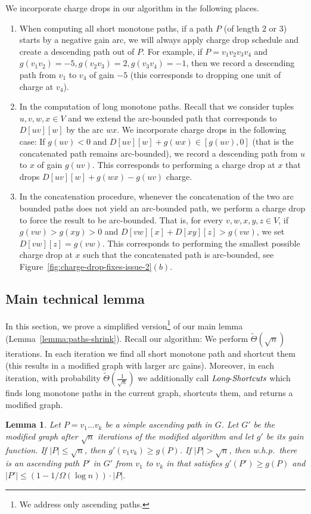 \documentclass[11pt]{article}
\newtheorem{lemma}[theorem]{Lemma}
\newcommand{\LS}{\mbox{{\it Long}-{\it Shortcuts}}}
\begin{document}
We incorporate charge drops in our algorithm in the following places.

\begin{enumerate}
    \item When computing all short monotone paths, if a path $P$ (of length $2$ or $3$) starts by a negative gain arc, we will always apply charge drop schedule and create a descending path out of $P$. For example, if $P = v_1 v_2 v_3 v_4$ and $g(v_1 v_2) = -5, g(v_2 v_3) = 2, g(v_3 v_4) = -1$, then we record a descending path from $v_1$ to $v_4$ of gain $-5$ (this corresponds to dropping one unit of charge at $v_4$).
    \item In the computation of long monotone paths. Recall that we consider tuples $u,v,w,x\in V$ and we extend the arc-bounded path that corresponds to $D[uv][w]$ by the arc $wx$. We incorporate charge drops in the following case: If $g(uv) < 0 $ and $D[uv][w]+g(wx)\in [g(uv) , 0]$ (that is the concatenated path remains arc-bounded), we record a descending path from $u$ to $x$ of gain $g(uv)$. This corresponds to performing a charge drop at $x$ that drops $D[uv][w]+g(wx)-g(uv)$ charge. 
    \item In the concatenation procedure, whenever the concatenation of the two arc bounded paths does not yield an arc-bounded path, we perform a charge drop to force the result to be arc-bounded. That is, for every $v,w,x,y,z\in V$, if $g(vw)>g(xy)>0$ and $D[vw][x] + D[xy][z] > g(vw)$, we set $D[vw][z] = g(vw)$. This corresponds to performing the smallest possible charge drop at $x$ such that the concatenated path is arc-bounded, see Figure~\ref{fig:charge-drop-fixes-issue-2}$(b)$. 
\end{enumerate}


\subsection{Main technical lemma}
In this section, we prove a simplified version\footnote{We address only ascending paths.} of our main lemma (Lemma~\ref{lemma:paths-shrink}). Recall our algorithm: We perform $\tilde{\Theta}(\sqrt{n})$ iterations. In each iteration we find all short monotone path and shortcut them (this results in a modified graph with larger arc gains). Moreover, in each iteration, with probability $\tilde{\Theta}(\frac{1}{\sqrt{n}})$ we additionally call $\LS$ which finds long monotone paths in the current graph, shortcuts them, and returns a modified graph.

\begin{lemma}\label{lemma:paths-shrink-simple-version}
    Let $P= v_1\ldots v_k$ be a simple ascending path in $G$. Let $G'$ be the modified graph after $\sqrt{n}$ iterations of the modified algorithm and let $g'$ be its gain function. If $|P| \le  \sqrt{n}$, then $g'(v_1v_k) \ge g(P)$. If $|P| > \sqrt{n}$, then w.h.p.\ there is an ascending path $P'$ in $G'$ from $v_1$ to $v_k$ in that satisfies $g'(P')\ge g(P)$ and $|P'| \le (1- 1/\Omega(\log n))\cdot |P|$.
\end{lemma}
\end{document}
